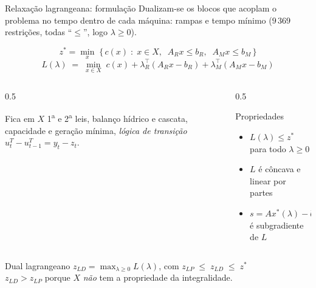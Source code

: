 \documentclass[10pt,aspectratio=169]{beamer}
\newcommand{\uT}{u^{T}}                %
\begin{document}
\begin{frame}{Relaxação lagrangeana: formulação}
  \small
  Dualizam-se os blocos que acoplam o problema no tempo dentro de cada máquina:
  \alert{rampas} e \alert{tempo mínimo} ($9\,369$ restrições, todas ``$\le$'',
  logo $\lambda \ge 0$).

  \[
    z^* = \min_{x} \; \bigl\{\, c(x) \;:\; x \in X,\;\; A_R x \le b_R,\;\; A_M x \le b_M \,\bigr\}
  \]
  \[
    L(\lambda) \;=\; \min_{x \in X} \;
      c(x) + \lambda_R^\top (A_R x - b_R) + \lambda_M^\top (A_M x - b_M)
  \]

  \begin{columns}[T]
    \begin{column}{0.5\textwidth}
      \begin{block}{Fica em $X$}
        \footnotesize
        1\textsuperscript{a} e 2\textsuperscript{a} leis, balanço hídrico e
        cascata, capacidade e geração mínima, \emph{lógica de transição}
        $\uT_t - \uT_{t-1} = y_t - z_t$.
      \end{block}
    \end{column}
    \begin{column}{0.5\textwidth}
      \begin{block}{Propriedades}
        \footnotesize
        \begin{itemize}\itemsep1pt
          \item $L(\lambda) \le z^*$ para todo $\lambda \ge 0$
          \item $L$ é côncava e linear por partes
          \item $s = A x^*(\lambda) - b$ é subgradiente de $L$
        \end{itemize}
      \end{block}
    \end{column}
  \end{columns}

  \vspace{0.4em}
  \begin{alertblock}{Dual lagrangeano}
    \centering
    $z_{LD} = \max_{\lambda \ge 0} L(\lambda)$, \qquad com \qquad
    $z_{LP} \;\le\; z_{LD} \;\le\; z^*$
    \\[2pt]
    {\footnotesize $z_{LD} > z_{LP}$ porque $X$ \emph{não} tem a propriedade
    da integralidade.}
  \end{alertblock}
\end{frame}
\end{document}
